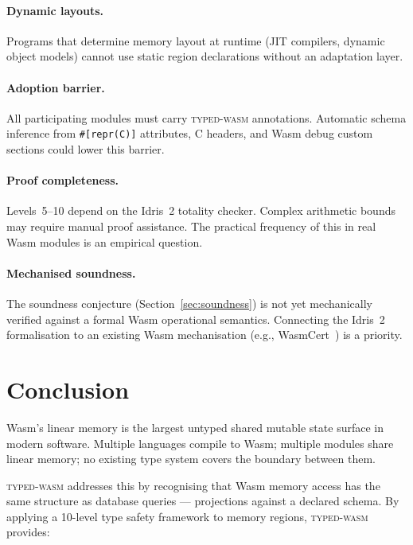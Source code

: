 \documentclass[11pt,a4paper]{article}
\newcommand{\typedwasm}{\textsc{typed-wasm}}
\newcommand{\eg}{e.g.}
\begin{document}
\paragraph{Dynamic layouts.}
Programs that determine memory layout at runtime (JIT compilers, dynamic
object models) cannot use static region declarations without an
adaptation layer.

\paragraph{Adoption barrier.}
All participating modules must carry \typedwasm{} annotations.  Automatic
schema inference from \lstinline{#[repr(C)]} attributes, C headers, and
Wasm debug custom sections could lower this barrier.

\paragraph{Proof completeness.}
Levels~5--10 depend on the Idris~2 totality checker.  Complex arithmetic
bounds may require manual proof assistance.  The practical frequency of
this in real Wasm modules is an empirical question.

\paragraph{Mechanised soundness.}
The soundness conjecture (Section~\ref{sec:soundness}) is not yet
mechanically verified against a formal Wasm operational semantics.
Connecting the Idris~2 formalisation to an existing Wasm mechanisation
(\eg, WasmCert~\cite{watt2018}) is a priority.

\section{Conclusion}
\label{sec:conclusion}

Wasm's linear memory is the largest untyped shared mutable state surface
in modern software.  Multiple languages compile to Wasm; multiple modules
share linear memory; no existing type system covers the boundary between
them.

\typedwasm{} addresses this by recognising that Wasm memory access has
the same structure as database queries --- projections against a declared
schema.  By applying a 10-level type safety framework to memory regions,
\typedwasm{} provides:
\end{document}
